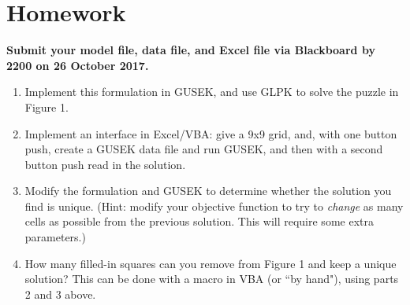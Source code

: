 \documentclass[10pt]{article}
\begin{document}
\section{Homework}  

{\bf Submit your model file, data file, and Excel file via Blackboard by 2200 on 26 October 2017.}

\begin{enumerate}

\item Implement this formulation in GUSEK, and use GLPK to solve the puzzle in Figure 1.
\item Implement an interface in Excel/VBA:  give a 9x9 grid, and, with one button push, create a GUSEK data file and run GUSEK, and then with a second button push read in the solution.




\item Modify the formulation and GUSEK to determine whether the solution you find is unique. (Hint: modify your objective function to try to {\it change} as many cells as possible from the previous solution.  This will require some extra parameters.)

\item How many filled-in squares can you remove from Figure 1 and keep a unique solution?  This can be done with a macro in VBA (or ``by hand"), using parts 2 and 3 above.

\end{enumerate}
\end{document}

